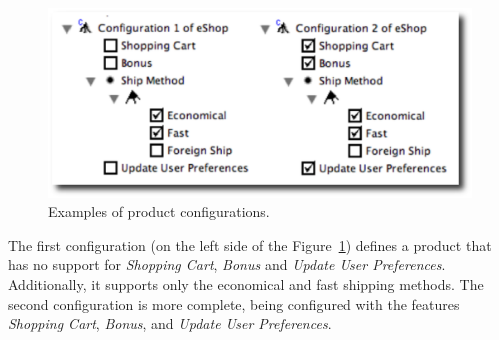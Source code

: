 \documentclass{acm_proc_article-sp}
\begin{document}
 \begin{figure}[h]
 \begin{center}
  \includegraphics[scale=0.33]{img/pc-04.eps}
   \caption{Examples of product configurations.}
  \label{fig:product-config-01-02}
  \end{center}
\end{figure}

The first configuration (on the left side of the
Figure~\ref{fig:product-config-01-02}) defines a product that has no support for
\emph{Shopping Cart}, \emph{Bonus} and \emph{Update User Preferences}.
Additionally, it supports only the economical and fast shipping methods. The
second configuration is more complete, being configured with the features
\emph{Shopping Cart}, \emph{Bonus}, and \emph{Update User Preferences}.
\end{document}
